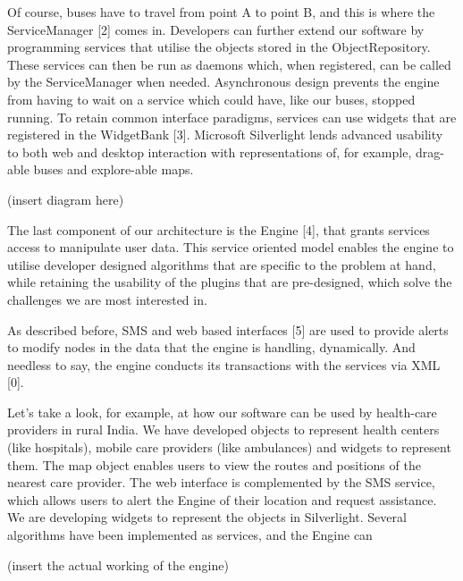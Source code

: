 \documentclass{report}
\begin{document}
Of course, buses have to travel from point A to point B, and this is where the ServiceManager [2] comes in.  Developers can further extend our software by programming services that utilise the objects stored in the ObjectRepository.  These services can then be run as daemons which, when registered, can be called by the ServiceManager when needed.  Asynchronous design prevents the engine from having to wait on a service which could have, like our buses, stopped running.  To retain common interface paradigms, services can use widgets that are registered in the WidgetBank [3].  Microsoft Silverlight lends advanced usability to both web and desktop interaction with representations of, for example, drag-able buses and explore-able maps. 

(insert diagram here)

\newpage
The last component of our architecture is the Engine [4], that grants services access to manipulate user data.  This service oriented model enables the engine to utilise developer designed algorithms that are specific to the problem at hand, while retaining the usability of the plugins that are pre-designed, which solve the challenges we are most interested in.

As described before, SMS and web based interfaces [5] are used to provide alerts to modify nodes in the data that the engine is handling, dynamically.  And needless to say, the engine conducts its transactions with the services via XML [0].

Let's take a look, for example, at how our software can be used by health-care providers in rural India.  We have developed objects to represent health centers (like hospitals), mobile care providers (like ambulances) and widgets to represent them.  The map object enables users to view the routes and positions of the nearest care provider.  The web interface is complemented by the SMS service, which allows users to alert the Engine of their location and request assistance.  We are developing widgets to represent the objects in Silverlight.  Several algorithms have been implemented as services, and the Engine can 

(insert the actual working of the engine)
\end{document}
